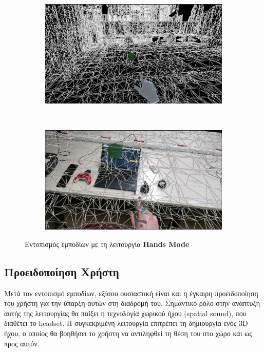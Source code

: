 \begin{figure}[!h]
    \centering
    \begin{subfigure}{1\textwidth}
        \centering
        \includegraphics[width=0.7\linewidth]{images/develop_HandsModeSimulationTest.png}
        \caption{}
    \end{subfigure}%
    \\
    \begin{subfigure}{1\textwidth}
        \centering
        \includegraphics[width=0.7\linewidth]{images/develop_HandsModeLabTest.png}
        \caption{}
    \end{subfigure}%
    \caption{Εντοπισμός εμποδίων με τη λειτουργία \textbf{Hands Mode}}\label{fig:developHandsModeExample}
\end{figure}

% 

\subsection{Προειδοποίηση Χρήστη}\label{subsec:developWarning}
Μετά τον εντοπισμό εμποδίων, εξίσου ουσιαστική είναι και η έγκαιρη προειδοποίηση του χρήστη για την ύπαρξη αυτών στη διαδρομή του. Σημαντικό ρόλο στην ανάπτυξη αυτής της λειτουργίας θα παίξει η τεχνολογία χωρικού ήχου (spatial sound), που διαθέτει το headset. Η συγκεκριμένη λειτουργία επιτρέπει τη δημιουργία ενός 3D ήχου, ο οποίος θα βοηθήσει το χρήστη να αντιληφθεί τη θέση του στο χώρο και ως προς αυτόν.

